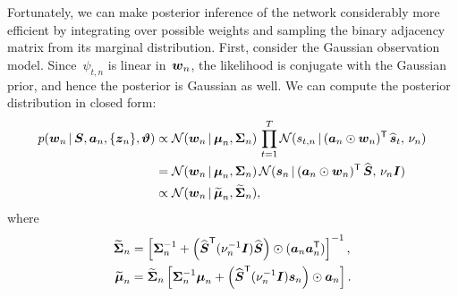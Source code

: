 Fortunately, we can make posterior inference of the
network considerably more efficient by integrating over
possible weights and sampling the binary adjacency
matrix from its marginal distribution. 
First, consider the Gaussian observation model.
Since~$\psi_{t,n}$ is linear in~$\boldsymbol{w}_n$, the likelihood
is conjugate with the Gaussian prior, and hence the
posterior is Gaussian as well. We can
compute the posterior distribution in closed form:
\begin{align}
  \nonumber
  p(\boldsymbol{w}_n \,|\, \boldsymbol{S}, \boldsymbol{a}_n, \{\boldsymbol{z}_n\}, \boldsymbol{\vartheta})
  &\propto
  \mathcal{N}(\boldsymbol{w}_n \,|\, \boldsymbol{\mu}_n, \boldsymbol{\Sigma}_n) \,
  \prod_{t=1}^T \mathcal{N}(s_{t,n} \,|\, (\boldsymbol{a}_n \odot \boldsymbol{w}_n)^{\mathsf{T}} \, \widehat{\boldsymbol{s}}_t, \, \nu_n) \\
  \nonumber
  &= \mathcal{N}(\boldsymbol{w}_n \,|\, \boldsymbol{\mu}_n, \boldsymbol{\Sigma}_n) \,
  \mathcal{N}(\boldsymbol{s}_n \,|\, (\boldsymbol{a}_n \odot \boldsymbol{w}_n)^{\mathsf{T}} \, \widehat{\boldsymbol{S}}, \, \nu_n \boldsymbol{I}) \\
  \label{eq:w_conditional}
  &\propto \mathcal{N}(\boldsymbol{w}_n \,|\, \widetilde{\boldsymbol{\mu}}_n, \widetilde{\boldsymbol{\Sigma}}_n),
\end{align}
where
\begin{align*}
  \widetilde{\boldsymbol{\Sigma}}_n &= \left[ \boldsymbol{\Sigma}_n^{-1} +
  \left(\widehat{\boldsymbol{S}}^{\mathsf{T}} (\nu_n^{-1} \boldsymbol{I}) \widehat{\boldsymbol{S}} \right) \odot (\boldsymbol{a}_n \boldsymbol{a}_n^{\mathsf{T}}) \right]^{-1}, \\
  \widetilde{\boldsymbol{\mu}}_n &= \widetilde{\boldsymbol{\Sigma}}_n \left[ \boldsymbol{\Sigma}_n^{-1} \boldsymbol{\mu}_n +
  \left(\widehat{\boldsymbol{S}}^{\mathsf{T}} (\nu_n^{-1} \boldsymbol{I})\boldsymbol{s}_n \right) \odot \boldsymbol{a}_n \right].
\end{align*}

